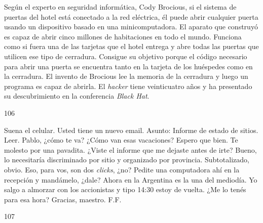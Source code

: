 \documentclass[12pt,twoside,openright,a5paper]{book}
\begin{document}
Según el experto en seguridad informática, Cody Brocious, si el sistema
de puertas del hotel está conectado a la red eléctrica, él puede abrir
cualquier puerta usando un dispositivo basado en una minicomputadora.
El aparato que construyó es capaz de abrir cinco millones de
habitaciones en todo el mundo.
Funciona como si fuera una de las tarjetas que el hotel entrega
y abre todas las puertas que utilicen ese tipo de cerradura. Consigue su
objetivo porque el código necesario para abrir una puerta se encuentra
tanto en la tarjeta de los huéspedes como en la cerradura. El invento de
Brocious lee la memoria de la cerradura y luego un programa es capaz de
abrirla. El \emph{hacker} tiene veinticuatro años y ha presentado su descubrimiento en la
conferencia \emph{Black Hat}.

\vspace{0.5cm}

\hrulefill \hspace{0.1cm}\decofourleft\hspace{0.2cm} 106 \hspace{0.2cm}\decofourright \hspace{0.1cm}\hrulefill

\nopagebreak

\vspace{0.5cm}

\nopagebreak

Suena el celular. Usted tiene un nuevo email. Asunto: Informe de estado de sitios. Leer. Pablo, ¿cómo te va? 
¿Cómo van esas vacaciones? Espero que bien.
Te molesto por una pavadita. ¿Viste el informe que me dejaste antes de irte?
Bueno, lo necesitaría discriminado por sitio y organizado por provincia.
Subtotalizado, obvio. Eso, para vos, son dos \emph{clicks}, ¿no?
Pedite una computadora ahí en la recepción y mandámelo, ¿dale? Ahora en la
Argentina es la una del mediodía. Yo salgo a almorzar con los accionistas
y tipo 14:30 estoy de vuelta. ¿Me lo tenés para esa hora?
Gracias, maestro.
F.F.

\vspace{0.5cm}

\hrulefill \hspace{0.1cm}\decofourleft\hspace{0.2cm} 107 \hspace{0.2cm}\decofourright \hspace{0.1cm}\hrulefill

\nopagebreak

\vspace{0.5cm}
\end{document}
